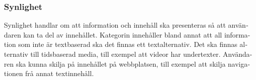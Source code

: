 \documentclass[11p]{article}
\begin{document}
\begin{otherlanguage}{swedish}
    \subsubsection{Synlighet} %
    Synlighet handlar om att information och innehåll ska presenteras så att användaren kan ta del av innehållet.
    Kategorin innehåller bland annat att all information som inte är textbaserad ska det finnas ett textalternativ.
    Det ska finnas alternativ till tidsbaserad media, till exempel att videor har undertexter.
    Användaren ska kunna skilja på innehållet på webbplatsen, till exempel att skilja navigationen frå annat textinnehåll.

    

\end{otherlanguage}
\end{document}
